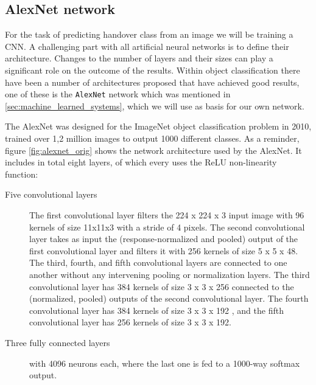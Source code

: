 \subsection{AlexNet network}

For the task of predicting handover class from an image we will be training a CNN. A challenging part with all artificial neural networks is to define their architecture. Changes to the number of layers and their sizes can play a significant role on the outcome of the results. Within object classification there have been a number of architectures proposed that have achieved good results, one of these is the \texttt{AlexNet} network which was mentioned in \ref{sec:machine_learned_systems}, which we will use as basis for our own network.

The AlexNet was designed for the ImageNet object classification problem in 2010, trained over 1,2 million images to output 1000 different classes.
As a reminder, figure \ref{fig:alexnet_orig} shows the network architecture used by the AlexNet. It includes in total eight layers, of which every uses the ReLU non-linearity function:

\begin{description}
	\item[Five convolutional layers] The first convolutional layer filters the 224 x 224 x 3 input image with 96 kernels of size 11x11x3 with a stride of 4 pixels. The second convolutional layer takes as input the (response-normalized and pooled) output of the first convolutional layer and filters it with 256 kernels of size 5 x 5 x 48. The third, fourth, and fifth convolutional layers are connected to one another without any intervening pooling or normalization layers. The third convolutional layer has 384 kernels of size 3 x 3 x 256 connected to the (normalized, pooled) outputs of the second convolutional layer. The fourth convolutional layer has 384 kernels of size 3 x 3 x 192 , and the fifth convolutional layer has 256 kernels of size 3 x 3 x 192.
	\item[Three fully connected layers] with 4096 neurons each, where the last one is fed to a 1000-way softmax output.
\end{description}

